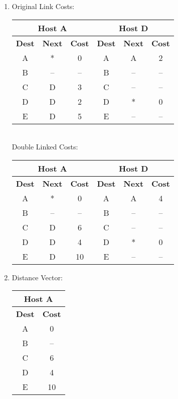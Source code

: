 \documentclass[11pt]{article}
\begin{document}
\begin{enumerate}[label=(\alph*)]
{\begin{enumerate}[label=(\alph*)]
	\item {
	
		Original Link Costs:
		
		\begin{tabular}{|ccc|ccc|}
		\hline
		\multicolumn{3}{|c|}{\textbf{Host A}} & \multicolumn{3}{c|}{\textbf{Host D}} \\ \hline
		\textbf{Dest} & \textbf{Next} & \textbf{Cost} & \textbf{Dest} & \textbf{Next} & \textbf{Cost} \\ \hline
		A & * & 0 & A & A & 2 \\
		B & -- & -- & B & -- & -- \\
		C & D & 3 & C & -- & -- \\
		D & D & 2 & D & * & 0 \\
		E & D & 5 & E & -- & -- \\ \hline
		\end{tabular} \\
		
		Double Linked Costs:
		
		\begin{tabular}{|ccc|ccc|}
		\hline
		\multicolumn{3}{|c|}{\textbf{Host A}} & \multicolumn{3}{c|}{\textbf{Host D}} \\ \hline
		\textbf{Dest} & \textbf{Next} & \textbf{Cost} & \textbf{Dest} & \textbf{Next} & \textbf{Cost} \\ \hline
		A & * & 0 & A & A & 4 \\
		B & -- & -- & B & -- & -- \\
		C & D & 6 & C & -- & -- \\
		D & D & 4 & D & * & 0 \\
		E & D & 10 & E & -- & -- \\ \hline
		\end{tabular}
	}
	
	\item {
		Distance Vector:
		
		\begin{tabular}{|cc|}
		\hline
		\multicolumn{2}{|c|}{\textbf{Host A}} \\ \hline
		\textbf{Dest} & \textbf{Cost} \\ \hline
		A & 0 \\
		B & -- \\
		C & 6 \\
		D & 4 \\
		E & 10 \\ \hline
		\end{tabular} \\
		
}
\end{enumerate}}
\end{enumerate}
\end{document}
